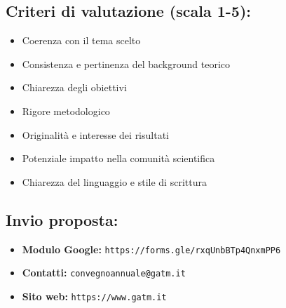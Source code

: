 \documentclass[12pt,a4paper]{article}
\begin{document}
\subsection*{Criteri di valutazione (scala 1-5):}
\begin{itemize}
    \item Coerenza con il tema scelto
    \item Consistenza e pertinenza del background teorico
    \item Chiarezza degli obiettivi
    \item Rigore metodologico
    \item Originalità e interesse dei risultati
    \item Potenziale impatto nella comunità scientifica
    \item Chiarezza del linguaggio e stile di scrittura
\end{itemize}

\subsection*{Invio proposta:}
\begin{itemize}
    \item \textbf{Modulo Google:} \texttt{https://forms.gle/rxqUnbBTp4QnxmPP6}
    \item \textbf{Contatti:} \texttt{convegnoannuale@gatm.it}
    \item \textbf{Sito web:} \texttt{https://www.gatm.it}
\end{itemize}
\end{document}
